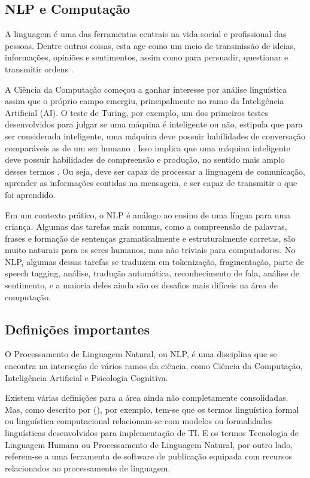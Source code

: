 \documentclass[
	12pt,				%
	openright,			%
	oneside,			%
	a4paper,			%
	english,			%
	spanish,			%
	brazil				%
	]{abntex2}
\begin{document}
		\subsection*{NLP e Computação}
		A linguagem é uma das ferramentas centrais na vida social e profissional das pessoas. Dentre outras coisas, esta age como um meio de transmissão de ideias, informações, opiniões e sentimentos, assim como para persuadir, questionar e transmitir ordens \cite{book_natural_lang}.
		
	A Ciência da Computação começou a ganhar interesse por análise linguística assim que o próprio campo emergiu, principalmente no ramo da Inteligência Artificial (AI). O teste de Turing, por exemplo, um dos primeiros testes desenvolvidos para julgar se uma máquina é inteligente ou não, estipula que para ser considerada inteligente, uma máquina deve possuir habilidades de conversação comparáveis as de um ser humano \cite{turing}. Isso implica que uma máquina inteligente deve possuir habilidades de compreensão e produção, no sentido mais amplo desses termos \cite{book_natural_lang}. Ou seja, deve ser capaz de processar a linguagem de comunicação, aprender as informações contidas na mensagem, e ser capaz de transmitir o que foi aprendido. 	
	
	Em um contexto prático, o NLP é análogo ao ensino de uma língua para uma criança. Algumas das tarefas mais comuns, como a compreensão de palavras, frases e formação de sentenças gramaticalmente e estruturalmente corretas, são muito naturais para os seres humanos, mas não triviais para computadores. No NLP, algumas dessas tarefas se traduzem em tokenização, fragmentação, parte de speech tagging, análise, tradução automática, reconhecimento de fala, análise de sentimento, e a maioria deles ainda são os desafios mais difíceis na área de computação\cite{book_natlang_python}.
		
	\subsection*{Definições importantes}
	O Processamento de Linguagem Natural, ou NLP, é uma disciplina que se encontra na interseção de vários ramos da ciência, como Ciência da Computação, Inteligência Artificial e Psicologia Cognitiva. 
	
Existem várias definições para a área ainda não completamente consolidadas. Mas, como descrito por  \citeauthor{book_natural_lang} (\citeyear{book_natural_lang}), por exemplo, tem-se que os termos linguística formal ou linguística computacional relacionam-se com modelos ou formalidades linguísticas desenvolvidos para implementação de TI. E os termos Tecnologia de Linguagem Humana ou Processamento de Linguagem Natural, por outro lado, referem-se a uma ferramenta de software de publicação equipada com recursos relacionados ao processamento de linguagem. 
\end{document}
